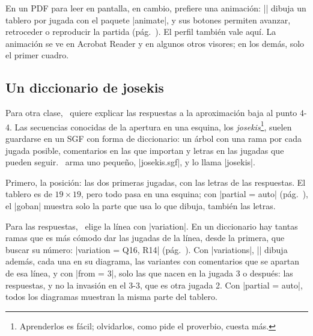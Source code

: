 \begin{goban}
En un PDF para leer en pantalla, en cambio, prefiere una animación: |\sgfanimation| dibuja un tablero por jugada con el paquete |animate|, y sus botones permiten avanzar, retroceder o reproducir la partida (pág.~\pageref{subsec:sgf}). El perfil también vale aquí. La animación se ve en Acrobat Reader y en algunos otros visores; en los demás, solo el primer cuadro.

\begin{codeexample}

\end{codeexample}

\begin{center}
\end{center}

\subsection{Un diccionario de josekis}
\label{tut:josekis}

Para otra clase, \karu\ quiere explicar las respuestas a la aproximación baja al punto 4-4. Las secuencias conocidas de la apertura en una esquina, los \emph{josekis}\footnote{Aprenderlos es fácil; olvidarlos, como pide el proverbio, cuesta más.}, suelen guardarse en un SGF con forma de diccionario: un árbol con una rama por cada jugada posible, comentarios en las que importan y letras en las jugadas que pueden seguir. \karu\ arma uno pequeño, |josekis.sgf|, y lo llama |josekis|.

Primero, la posición: las dos primeras jugadas, con las letras de las respuestas. El tablero es de $19\times19$, pero todo pasa en una esquina; con |partial = auto| (pág.~\pageref{tut:parcial}), el |goban| muestra solo la parte que usa lo que dibuja, también las letras.

\begin{codeexample}[]

	\begin{goban}[sgf size = josekis, partial = auto]
	\end{goban}
\end{codeexample}

Para las respuestas, \karu\ elige la línea con |variation|. En un diccionario hay tantas ramas que es más cómodo dar las jugadas de la línea, desde la primera, que buscar su número: |variation = {Q16, R14}| (pág.~\pageref{subsec:sgf}). Con |variations|, |\sgfdiagrams| dibuja además, cada una en su diagrama, las variantes con comentarios que se apartan de esa línea, y con |from = 3|, solo las que nacen en la jugada 3 o después: las respuestas, y no la invasión en el 3-3, que es otra jugada 2. Con |partial = auto|, todos los diagramas muestran la misma parte del tablero.


\end{goban}
